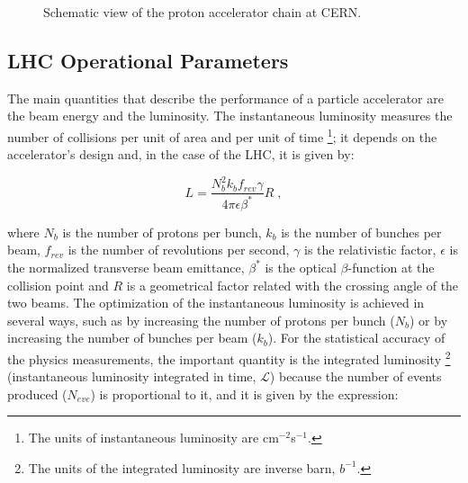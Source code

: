 \begin{figure}[ht]
\begin{center}
\caption{Schematic view of the proton accelerator chain at CERN.}\label{figchp2:LHCaccelerationchain}
\end{center}
\end{figure}



\subsection{LHC Operational Parameters}
\label{sec:LHCparameters}

The main quantities that describe the performance of a particle accelerator are the beam energy and 
the luminosity. The instantaneous luminosity measures the number of collisions per unit of area 
and per unit of time \footnote[1]{The units of instantaneous luminosity are 
cm$^{-2}$s$^{-1}$.}; it depends on the accelerator's design and, in the 
case of the LHC, it is given by:

\begin{equation}
 L = \frac{N_{b}^{2}k_{b}f_{rev}\gamma}{4 \pi \epsilon \beta^{*}}R \;,
\end{equation}

\noindent where $N_{b}$ is the number of protons per bunch, $k_{b}$ is the number of bunches per beam, $f_{rev}$
is the number of revolutions per second, $\gamma$ is the relativistic factor, $\epsilon$ is the 
normalized transverse beam emittance, $\beta^{*}$ is the optical $\beta$-function at the
collision point and $R$ is a
geometrical factor related with the crossing angle of the two beams. The optimization of 
the instantaneous luminosity is achieved in several ways, such as by increasing the number
of protons per bunch ($N_{b}$) or by increasing the number of bunches per beam ($k_{b}$). For the statistical accuracy 
of the physics measurements, the important quantity is the integrated luminosity \footnote[1]{The units of the 
integrated luminosity are inverse barn, $b^{-1}$.} (instantaneous luminosity integrated in time, $\mathscr{L}$) because the number of events 
produced ($N_{eve}$) is proportional to it, and it is given by the expression:

